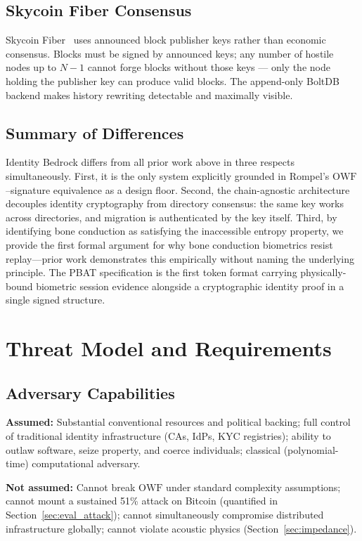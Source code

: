 \documentclass[11pt,a4paper]{article}
\theoremstyle{definition}
\newcommand{\OWF}{\mathrm{OWF}}
\newcommand{\PBAT}{\textsf{PBAT}}
\newcommand{\BD}{\textsf{Identity Bedrock}}
\begin{document}
\subsection{Skycoin Fiber Consensus}

Skycoin Fiber~\cite{Skycoin} uses announced block publisher keys
rather than economic consensus. Blocks must be signed by announced
keys; any number of hostile nodes up to $N-1$ cannot forge blocks
without those keys --- only the node holding the publisher key can
produce valid blocks. The append-only BoltDB backend makes history
rewriting detectable and maximally visible.

\subsection{Summary of Differences}

\BD{} differs from all prior work above in three respects
simultaneously. First, it is the only system explicitly grounded in
Rompel's $\OWF$--signature equivalence as a design floor. Second, the
chain-agnostic architecture decouples identity cryptography from
directory consensus: the same key works across directories, and
migration is authenticated by the key itself. Third, by identifying
bone conduction as satisfying the inaccessible entropy property, we
provide the first formal argument for why bone conduction biometrics
resist replay---prior work demonstrates this empirically without
naming the underlying principle. The \PBAT{} specification is the
first token format carrying physically-bound biometric session
evidence alongside a cryptographic identity proof in a single signed
structure.

\section{Threat Model and Requirements}
\label{sec:threat}

\subsection{Adversary Capabilities}

\textbf{Assumed:} Substantial conventional resources and political
backing; full control of traditional identity infrastructure (CAs,
IdPs, KYC registries); ability to outlaw software, seize property,
and coerce individuals; classical (polynomial-time) computational
adversary.

\textbf{Not assumed:} Cannot break $\OWF$ under standard complexity
assumptions; cannot mount a sustained 51\% attack on Bitcoin
(quantified in Section~\ref{sec:eval_attack}); cannot simultaneously
compromise distributed infrastructure globally; cannot violate
acoustic physics (Section~\ref{sec:impedance}).
\end{document}
